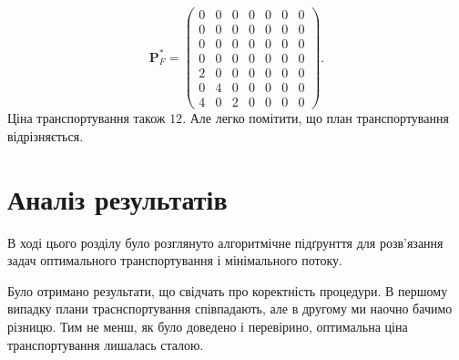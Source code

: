$$
\mathbf{P}^*_F =
\begin{pmatrix}
     0&  0& 0& 0& 0& 0& 0\\
     0&  0& 0& 0& 0& 0& 0\\
     0&  0& 0& 0& 0& 0& 0\\
     0&  0& 0& 0& 0& 0& 0\\
     2&  0& 0& 0& 0& 0& 0\\
     0&  4& 0& 0& 0& 0& 0\\
     4&  0& 2& 0& 0& 0& 0
\end{pmatrix}.
$$
Ціна транспортування також $12$. Але легко помітити, що план транспортування відрізняється.

\section{Аналіз результатів}
В ході цього розділу було розглянуто алгоритмічне підґрунття для розв'язання задач оптимального транспортування і 
мінімального потоку.

Було отримано результати, що свідчать про коректність процедури. 
В першому випадку плани траснспортування співпадають, але в другому ми наочно бачимо різницю. Тим не менш, як було доведено і
перевірино, оптимальна ціна транспортування лишалась сталою.